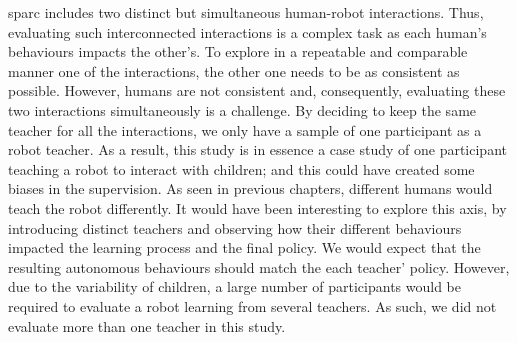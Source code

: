 \gls{sparc} includes two distinct but simultaneous human-robot interactions. Thus, evaluating such interconnected interactions is a complex task as each human's behaviours impacts the other's. To explore in a repeatable and comparable manner one of the interactions, the other one needs to be as consistent as possible. However, humans are not consistent and, consequently, evaluating these two interactions simultaneously is a challenge. By deciding to keep the same teacher for all the interactions, we only have a sample of one participant as a robot teacher. As a result, this study is in essence a case study of one participant teaching a robot to interact with children; and this could have created some biases in the supervision. As seen in previous chapters, different humans would teach the robot differently. It would have been interesting to explore this axis, by introducing distinct teachers and observing how their different behaviours impacted the learning process and the final policy. We would expect that the resulting autonomous behaviours should match the each teacher' policy. However, due to the variability of children, a large number of participants would be required to evaluate a robot learning from several teachers. As such, we did not evaluate more than one teacher in this study.
%


